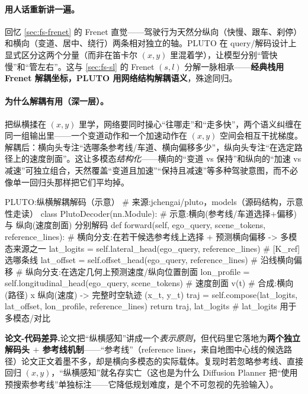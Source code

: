 \paragraph{用人话重新讲一遍。}
回忆 \cref{sec:fs-frenet} 的 Frenet 直觉——驾驶行为天然分纵向（快慢、跟车、刹停）和横向（变道、居中、绕行）两条相对独立的轴。PLUTO 在 query/解码设计上显式区分这两个分量（而非在笛卡尔 $(x,y)$ 里混着学），让模型分别“管快慢”和“管左右”。这与 \cref{sec:fs-sl} 的 Frenet $(s,l)$ 分解一脉相承——\textbf{经典栈用 Frenet 解耦坐标，PLUTO 用网络结构解耦语义}，殊途同归。

\paragraph{为什么解耦有用（深一层）。}
把纵横揉在 $(x,y)$ 里学，网络要同时操心“往哪走”和“走多快”，两个语义纠缠在同一组输出里——一个变道动作和一个加速动作在 $(x,y)$ 空间会相互干扰梯度。解耦后：横向头专注“选哪条参考线/车道、横向偏移多少”，纵向头专注“在选定路径上的速度剖面”。这让多模态\emph{结构化}——横向的“变道 vs 保持”和纵向的“加速 vs 减速”可独立组合，天然覆盖“变道且加速”“保持且减速”等多种驾驶意图，而不必像单一回归头那样把它们平均掉。

\begin{codebox}[Python]{PLUTO:纵横解耦解码（示意）}
# 来源:jchengai/pluto，models（源码结构，示意性走读）
class PlutoDecoder(nn.Module):  # 示意:横向(参考线/车道选择+偏移) 与 纵向(速度剖面) 分别解码
    def forward(self, ego_query, scene_tokens, reference_lines):
        # 横向分支:在若干候选参考线上选择 + 预测横向偏移 -> 多模态来源之一
        lat_logits = self.lateral_head(ego_query, reference_lines)   # [K_ref] 选哪条线
        lat_offset = self.offset_head(ego_query, reference_lines)    # 沿线横向偏移
        # 纵向分支:在选定几何上预测速度/纵向位置剖面
        lon_profile = self.longitudinal_head(ego_query, scene_tokens)  # 速度剖面 v(t)
        # 合成:横向(路径) x 纵向(速度) -> 完整时空轨迹 (x_t, y_t)
        traj = self.compose(lat_logits, lat_offset, lon_profile, reference_lines)
        return traj, lat_logits     # lat_logits 用于多模态/对比
\end{codebox}

\begin{note}
\textbf{论文-代码差异.}\;论文把“纵横感知”讲成一个\emph{表示原则}，但代码里它落地为\textbf{两个独立解码头 $+$ 参考线机制}——“参考线”（reference lines，来自地图中心线的候选路径）论文正文着墨不多，却是横向多模态的实际载体。复现时若忽略参考线、直接回归 $(x,y)$，“纵横感知”就名存实亡（这也是为什么 Diffusion Planner 把“使用预搜索参考线”单独标注——它降低规划难度，是个不可忽视的先验输入）。
\end{note}


